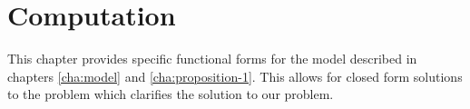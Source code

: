 
\chapter{Computation}
\label{cha:computation-1}

This chapter provides specific functional forms for the model
described in chapters \ref{cha:model} and
\ref{cha:proposition-1}. This allows for closed form solutions to the
problem which clarifies the solution to our problem.


